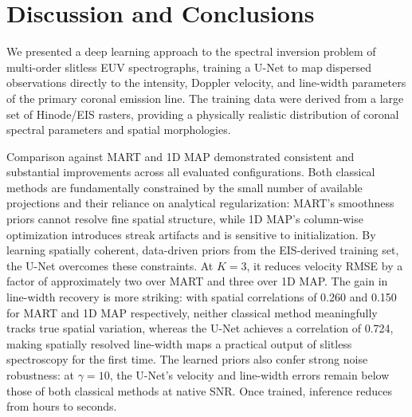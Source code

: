 \documentclass[linenumbers,twocolumn]{aastex7}
\begin{document}

\section{Discussion and Conclusions} \label{sec:disc}
We presented a deep learning approach to the spectral inversion problem of
multi-order slitless EUV spectrographs, training a U-Net to map dispersed
observations directly to the intensity, Doppler velocity, and line-width
parameters of the primary coronal emission line. The training data were derived
from a large set of Hinode/EIS rasters, providing a physically realistic
distribution of coronal spectral parameters and spatial morphologies.

Comparison against MART and 1D MAP demonstrated consistent and substantial
improvements across all evaluated configurations. Both classical methods are
fundamentally constrained by the small number of available projections and their
reliance on analytical regularization: MART's smoothness priors cannot resolve
fine spatial structure, while 1D MAP's column-wise optimization introduces
streak artifacts and is sensitive to initialization. By learning spatially
coherent, data-driven priors from the EIS-derived training set, the U-Net
overcomes these constraints. At $K=3$, it reduces velocity RMSE by a factor of
approximately two over MART and three over 1D MAP. The gain in line-width
recovery is more striking: with spatial correlations of 0.260 and 0.150 for
MART and 1D MAP respectively, neither classical method meaningfully tracks true
spatial variation, whereas the U-Net achieves a correlation of 0.724, making
spatially resolved line-width maps a practical output of slitless spectroscopy
for the first time. The learned priors also confer strong noise robustness: at
$\gamma=10$, the U-Net's velocity and line-width errors remain below those of
both classical methods at native SNR. Once trained, inference reduces from hours
to seconds.
\end{document}
